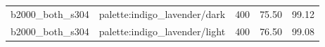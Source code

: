 \begin{longtable}{l>{\raggedright\arraybackslash}p{.42\linewidth}rrr}
b2000\_\allowbreak{}both\_\allowbreak{}s304 & %
palette:indigo\_\allowbreak{}lavender/dark & %
400 & %
75.50 & %
99.12 \\ %

b2000\_\allowbreak{}both\_\allowbreak{}s304 & %
palette:indigo\_\allowbreak{}lavender/light & %
400 & %
76.50 & %
99.08 \\ %


\end{longtable}
